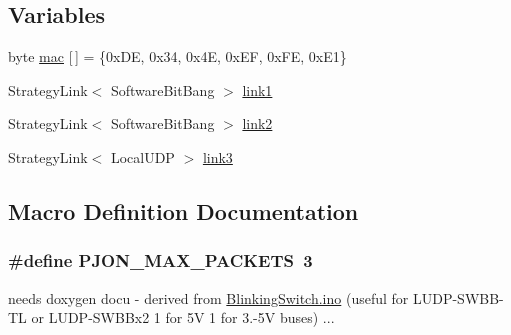 \subsection*{Variables}
\begin{DoxyCompactItemize}
\item 
byte \hyperlink{BlinkingSwitch__3way_8ino_aea3f7775fecafb66a619eb2dcb0357bd}{mac} \mbox{[}$\,$\mbox{]} = \{0x\-D\-E, 0x34, 0x4\-E, 0x\-E\-F, 0x\-F\-E, 0x\-E1\}
\item 
Strategy\-Link$<$ Software\-Bit\-Bang $>$ \hyperlink{BlinkingSwitch__3way_8ino_ae2f4f4a5ca9a8a627a5132d1868bf5c0}{link1}
\item 
Strategy\-Link$<$ Software\-Bit\-Bang $>$ \hyperlink{BlinkingSwitch__3way_8ino_a6ab0c6e3e6ae04f06e58b38531729623}{link2}
\item 
Strategy\-Link$<$ Local\-U\-D\-P $>$ \hyperlink{BlinkingSwitch__3way_8ino_ad4e8fc0fe300da7ae962f45bc8357a3b}{link3}
\end{DoxyCompactItemize}


\subsection{Macro Definition Documentation}
\hypertarget{BlinkingSwitch__3way_8ino_af093da5eac99580be6ba61b4dc79f2c1}{
\subsubsection[{P\-J\-O\-N\-\_\-\-M\-A\-X\-\_\-\-P\-A\-C\-K\-E\-T\-S}]{\setlength{\rightskip}{0pt plus 5cm}\#define P\-J\-O\-N\-\_\-\-M\-A\-X\-\_\-\-P\-A\-C\-K\-E\-T\-S~3}}\label{BlinkingSwitch__3way_8ino_af093da5eac99580be6ba61b4dc79f2c1}
needs doxygen docu -\/ derived from \hyperlink{BlinkingSwitch_8ino}{Blinking\-Switch.\-ino} (useful for L\-U\-D\-P-\/\-S\-W\-B\-B-\/\-T\-L or L\-U\-D\-P-\/\-S\-W\-B\-Bx2 1 for 5\-V 1 for 3.-\/5\-V buses) ... 


